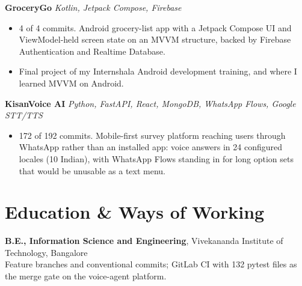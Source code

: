 \documentclass[10pt,a4paper]{article}
\begin{document}
\vspace{1pt}
\textbf{GroceryGo} \textit{Kotlin, Jetpack Compose, Firebase}
\begin{itemize}
  \item 4 of 4 commits. Android grocery-list app with a Jetpack Compose UI and ViewModel-held screen
        state on an MVVM structure, backed by Firebase Authentication and Realtime Database.
  \item Final project of my Internshala Android development training, and where I learned MVVM on
        Android.
\end{itemize}

\vspace{1pt}
\textbf{KisanVoice AI} \textit{Python, FastAPI, React, MongoDB, WhatsApp Flows, Google STT/TTS}
\begin{itemize}
  \item 172 of 192 commits. Mobile-first survey platform reaching users through WhatsApp rather than
        an installed app: voice answers in 24 configured locales (10 Indian), with WhatsApp Flows
        standing in for long option sets that would be unusable as a text menu.
\end{itemize}

\section{Education \& Ways of Working}
\textbf{B.E., Information Science and Engineering}, Vivekananda Institute of Technology, Bangalore\\
Feature branches and conventional commits; GitLab CI with 132 pytest files as the merge gate on the
voice-agent platform.
\end{document}
